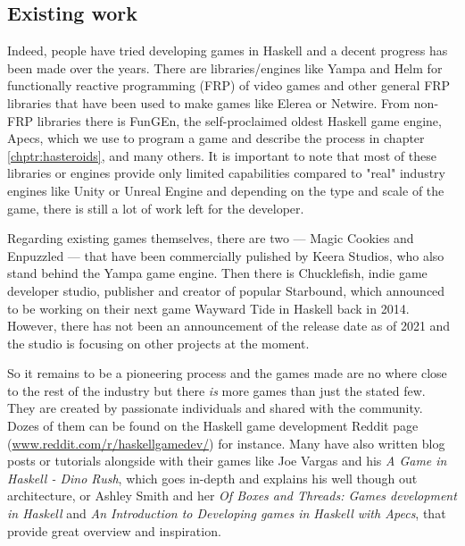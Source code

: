\documentclass[
  digital, %
  color,   %
  table,   %
  oneside, %
  lof,     %
  lot,     %
]{fithesis3}
\begin{document}
\subsection{Existing work}
Indeed, people have tried developing games in Haskell and a decent
progress has been made over the years. There are libraries/engines like Yampa\cite{yamparepo}
and Helm\cite{helmrepo} for functionally reactive programming (FRP) of video games and
other general FRP libraries that have been used to make games like Elerea\cite{elerearepo}
or Netwire\cite{netwirerepo}. From non-FRP libraries there is
FunGEn\cite{fungenrepo}, the self-proclaimed oldest Haskell game engine,
Apecs, which we use to program a game and describe the process in chapter
\ref{chptr:hasteroids}, and many others. It is important to note that
most of these libraries or engines provide only limited capabilities
compared to "real" industry engines like Unity or Unreal Engine
and depending on the type and scale of the game, there is still a lot
of work left for the developer.

Regarding existing games themselves, there are two --- Magic Cookies and
Enpuzzled --- that have been commercially pulished by Keera Studios,
who also stand behind the Yampa game engine\cite{keerastudios}.
Then there is Chucklefish, indie game developer studio, publisher and
creator of popular Starbound, which announced to be working on their next
game Wayward Tide in Haskell back in 2014\cite{waywardtide}. However, there
has not been an announcement of the release date as of 2021 and the studio is
focusing on other projects at the moment.

So it remains to be a pioneering process and the games made are no where close
to the rest of the industry but there \emph{is} more games than just the stated few.
They are created by passionate individuals and shared with the community. Dozes of them can be found
on the Haskell game development Reddit page (\url{www.reddit.com/r/haskellgamedev/})
for instance. Many have also written blog posts or tutorials alongside with
their games like Joe Vargas and his \textit{A Game in Haskell - Dino Rush}\cite{dinorush},
which goes in-depth and explains his well though out architecture,
or Ashley Smith and her \textit{Of Boxes and Threads: Games development in Haskell}\cite{aashaskell}
and \textit{An Introduction to Developing games in Haskell with Apecs}\cite{aasapecs},
that provide great overview and inspiration.
\end{document}
